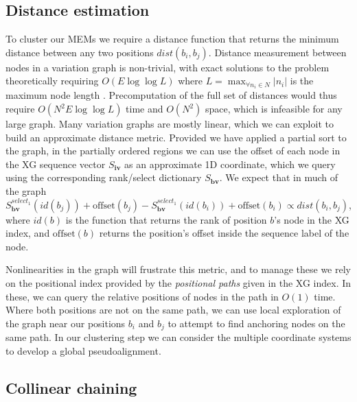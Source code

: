 \subsection{Distance estimation}
\label{sec:distance_estimation}
To cluster our MEMs we require a distance function that returns the minimum distance between any two positions $dist(b_i, b_j)$. %
Distance measurement between nodes in a variation graph is non-trivial, with exact solutions to the problem theoretically requiring $O(E \log \log L)$ where $L = \max_{\forall n_i \in N} |n_i|$ is the maximum node length \cite{karlsson1983mlog}.
Precomputation of the full set of distances would thus require $O(N^2 E \log \log L)$ time and $O(N^2)$ space, which is infeasible for any large graph.
Many variation graphs are mostly linear, which we can exploit to build an approximate distance metric.
Provided we have applied a partial sort to the graph, in the partially ordered regions we can use the offset of each node in the XG sequence vector $S_\textbf{iv}$ as an approximate 1D coordinate, which we query using the corresponding rank/select dictionary $S_\textbf{bv}$.
We expect that in much of the graph $S_\textbf{bv}^{select_1}(id(b_j))+\mbox{offset}(b_j) - S_\textbf{bv}^{select_1}(id(b_i))+\mbox{offset}(b_i) \propto dist(b_i, b_j)$, where $id(b)$ is the function that returns the rank of position $b$'s node in the XG index, and $\mbox{offset}(b)$ returns the position's offset inside the sequence label of the node.

Nonlinearities in the graph will frustrate this metric, and to manage these we rely on the positional index provided by the \emph{positional paths} given in the XG index.
In these, we can query the relative positions of nodes in the path in $O(1)$ time.
Where both positions are not on the same path, we can use local exploration of the graph near our positions $b_i$ and $b_j$ to attempt to find anchoring nodes on the same path.
In our clustering step we can consider the multiple coordinate systems to develop a global pseudoalignment.

\subsection{Collinear chaining}
\label{sec:collinear_chaining}

